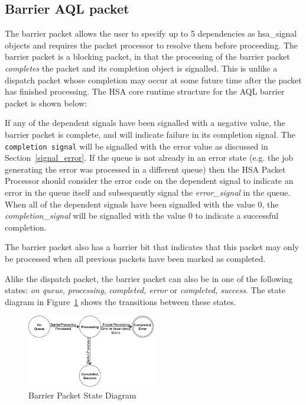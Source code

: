 \documentclass{book}
\newcommand{\reffld}[1]{\textit{#1}}
\newcommand{\reftyp}[1]{#1}
\begin{document}


\hypertarget{barrier_packet}{}\subsection{Barrier AQL
packet}\label{barrier_packet}
The barrier packet allows the user to specify up to 5 dependencies
as \reftyp{hsa\_signal} objects and requires the packet processor to
resolve them before proceeding. The barrier packet is a blocking
packet, in that the processing of the barrier packet
\emph{completes} the packet and its completion object is signalled.
This is unlike a dispatch packet whose completion may occur at some
future time after the packet has finished processing. The HSA core
runtime structure for the AQL barrier packet is shown below:



If any of the dependent signals have been signalled with a negative
value, the barrier packet is complete, and will indicate failure in
its completion signal. The \texttt{completion signal} will be
signalled with the error value as discussed in
Section~\ref{signal_error}. If the queue is not already in an error
state (e.g. the job generating the error was processed in a different
queue) then the HSA Packet Processor should consider the error code on
the dependent signal to indicate an error in the queue itself and
subsequently signal the \reffld{error\_signal} in the queue. When all
of the dependent signals have been signalled with the value 0, the
\reffld{completion\_signal} will be signalled with the value 0 to
indicate a successful completion.

The barrier packet also has a barrier bit that indicates that this
packet may only be processed when all previous packets have been
marked as completed.

Alike the dispatch packet, the barrier packet can also be in one of
the following states: \emph{on queue}, \emph{processing},
\emph{completed, error} or \emph{completed, success}. The state
diagram in Figure~\ref{fig:barrierpacketstate} shows the transitions
between these states.

\begin{figure}
  \centering
  \includegraphics[width=0.5\textwidth] {fig/barrierpacketstate}
  \centering
  \caption{Barrier Packet State Diagram}
  \label{fig:barrierpacketstate}
\end{figure}
\end{document}
